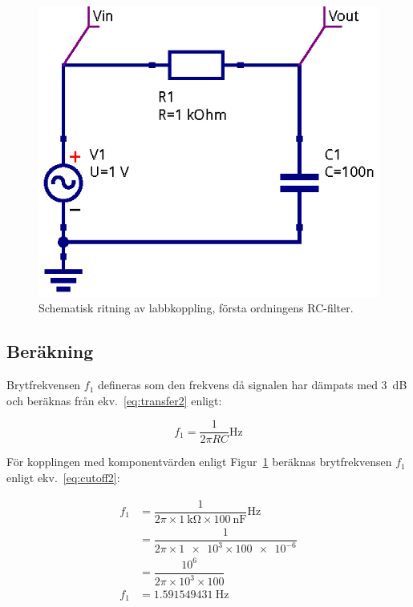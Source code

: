 \begin{figure}\label{fig:rc-schema}
  \centering
  \includegraphics[width=0.8\linewidth]{sim/ee466_lab-4_prj/uppgift-0_schema}
  \caption[Schematisk ritning av labbkoppling, första ordningens RC-filter.]
  {Schematisk ritning av labbkoppling, första ordningens RC-filter.}
\end{figure}


\subsection{Beräkning}
Brytfrekvensen $f_1$ defineras som den frekvens då signalen har dämpats med
\SI{3}{\dB} och beräknas från ekv.~\eqref{eq:transfer2} enligt:

\begin{equation}\label{eq:cutoff}
  f_1 = \dfrac{1}{2 \pi R C} \si{\Hz}
\end{equation}

För kopplingen med komponentvärden enligt Figur~\ref{fig:rc-schema} beräknas
brytfrekvensen $f_1$ enligt ekv.~\eqref{eq:cutoff2}:

\begin{equation}\label{eq:cutoff2}
  \begin{split}
    f_1 &= \dfrac{1}{2    \pi \times \SI{1}{\kohm} \times \SI{100}{\nano\farad}} \si{\Hz} \\
        &= \dfrac{1}{2    \pi \times \num{1e3} \times \num{100e-6}}                       \\
        &= \dfrac{10^6}{2 \pi \times 10^3 \times \num{100}}                               \\
    f_1 &= \SI{1.591549431}{\Hz}
  \end{split}
\end{equation}

